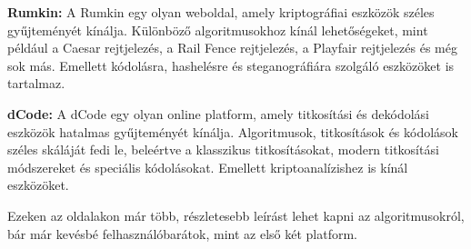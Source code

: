 \textbf{Rumkin:} A Rumkin egy olyan weboldal, amely kriptográfiai eszközök széles gyűjteményét kínálja. Különböző algoritmusokhoz kínál lehetőségeket, mint például a Caesar rejtjelezés, a Rail Fence rejtjelezés, a Playfair rejtjelezés és még sok más. Emellett kódolásra, hashelésre és steganográfiára szolgáló eszközöket is tartalmaz.

\textbf{dCode:} A dCode egy olyan online platform, amely titkosítási és dekódolási eszközök hatalmas gyűjteményét kínálja. Algoritmusok, titkosítások és kódolások széles skáláját fedi le, beleértve a klasszikus titkosításokat, modern titkosítási módszereket és speciális kódolásokat. Emellett kriptoanalízishez is kínál eszközöket.

Ezeken az oldalakon már több, részletesebb leírást lehet kapni az algoritmusokról, bár már kevésbé felhasználóbarátok, mint az első két platform.



